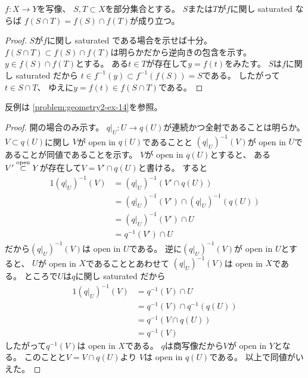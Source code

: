 \documentclass[report]{jlreq}
\begin{document}
\begin{proposition}
    $f \colon X \to Y$を写像、
    $S, T \subset X$を部分集合とする。
    $S$または$T$が$f$に関し saturated ならば
    $f(S \cap T) = f(S) \cap f(T)$が成り立つ。
\end{proposition}

\begin{proof}
    $S$が$f$に関し saturated である場合を示せば十分。
    $f(S \cap T) \subset f(S) \cap f(T)$は明らかだから逆向きの包含を示す。
    $y \in f(S) \cap f(T)$とする。
    ある$t \in T$が存在して$y = f(t)$をみたす。
    $S$は$f$に関し saturated だから
    $t \in f^{-1}(y) \subset f^{-1}(f(S)) = S$である。
    したがって$t \in S \cap T$、
    ゆえに$y = f(t) \in f(S \cap T)$である。
\end{proof}


\begin{remark}
    反例は
    \cref{problem:geometry2-ex-14}を参照。
\end{remark}

\begin{proof}
    開の場合のみ示す。
    $q|_U \colon U \to q(U)$が連続かつ全射であることは明らか。
    $V \subset q(U)$に関し
    $V$が open in $q(U)$であることと
    $(q|_U)^{-1}(V)$が open in $U$であることが同値であることを示す。
    $V$が open in $q(U)$とすると、
    ある$V' \stackrel{\text{open}}{\subset} Y$が存在して$V = V' \cap q(U)$と書ける。
    すると
    \begin{alignat}{1}
        (q|_U)^{-1}(V)
            &= (q|_U)^{-1}(V' \cap q(U)) \\
            &= (q|_U)^{-1}(V') \cap (q|_U)^{-1}(q(U)) \\
            &= (q|_U)^{-1}(V') \cap U \\
            &= q^{-1}(V') \cap U
    \end{alignat}
    だから$(q|_U)^{-1}(V)$は open in $U$である。
    逆に$(q|_U)^{-1}(V)$が open in $U$とすると、
    $U$が open in $X$であることとあわせて
    $(q|_U)^{-1}(V)$は open in $X$である。
    ところで$U$は$q$に関し saturated だから
    \begin{alignat}{1}
        (q|_U)^{-1}(V)
            &= q^{-1}(V) \cap U \\
            &= q^{-1}(V) \cap q^{-1}(q(U)) \\
            &= q^{-1}(V \cap q(U)) \\
            &= q^{-1}(V)
    \end{alignat}
    したがって$q^{-1}(V)$は open in $X$である。
    $q$は商写像だから$V$が open in $Y$となる。
    このことと$V = V \cap q(U)$より
    $V$は open in $q(U)$である。
    以上で同値がいえた。
\end{proof}
\end{document}
